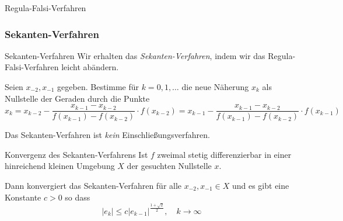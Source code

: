\begin{example}{Regula-Falsi-Verfahren}
\begin{center}
    \end{center}
\end{example}

\subsubsection{Sekanten-Verfahren}

\begin{defi}{Sekanten-Verfahren}
    Wir erhalten das \emph{Sekanten-Verfahren}, indem wir das Regula-Falsi-Verfahren leicht abändern.
    
    Seien $x_{-2}, x_{-1}$ gegeben.
    Bestimme für $k = 0, 1, \ldots$ die neue Näherung $x_k$ als Nullstelle der Geraden durch die Punkte
    \[
        x_k = x_{k-2} - \frac{x_{k-1} - x_{k-2}}{f(x_{k-1}) - f(x_{k-2})} \cdot f(x_{k-2}) = x_{k-1} - \frac{x_{k-1} - x_{k-2}}{f(x_{k-1}) - f(x_{k-2})} \cdot f(x_{k-1})
    \]
    
    Das Sekanten-Verfahren ist \emph{kein} Einschließungsverfahren.
\end{defi}

\begin{bonus}{Konvergenz des Sekanten-Verfahrens}
    Ist $f$ zweimal stetig differenzierbar in einer hinreichend kleinen Umgebung $X$ der gesuchten Nullstelle $x$.
    
    Dann konvergiert das Sekanten-Verfahren für alle $x_{-2}, x_{-1} \in X$ und es gibt eine Konstante $c > 0$ so dass
    \[
        |e_k| \leq c |e_{k-1}|^{\frac{1+\sqrt{2}}{2}}, \quad k \to \infty
    \]
\end{bonus}

